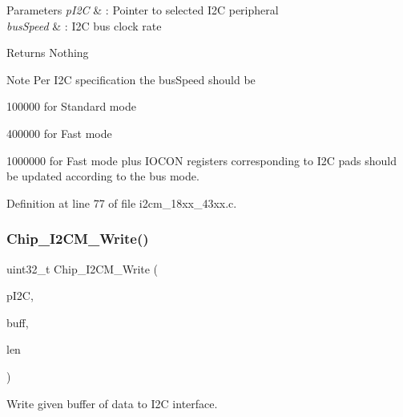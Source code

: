 \begin{DoxyParams}{Parameters}
{\em p\+I2C} & \+: Pointer to selected I2C peripheral \\
\hline
{\em bus\+Speed} & \+: I2C bus clock rate \\
\hline
\end{DoxyParams}
\begin{DoxyReturn}{Returns}
Nothing 
\end{DoxyReturn}
\begin{DoxyNote}{Note}
Per I2C specification the bus\+Speed should be \begin{DoxyItemize}
\item 100000 for Standard mode \item 400000 for Fast mode \item 1000000 for Fast mode plus I\+O\+C\+ON registers corresponding to I2C pads should be updated according to the bus mode. \end{DoxyItemize}

\end{DoxyNote}


Definition at line 77 of file i2cm\+\_\+18xx\+\_\+43xx.\+c.

\mbox{\label{group___i2_c_m__18_x_x__43_x_x_ga6f18f520e51c790fef5009e9446f74d5}} 
\subsubsection{\texorpdfstring{Chip\+\_\+\+I2\+C\+M\+\_\+\+Write()}{Chip\_I2CM\_Write()}}
{\footnotesize\ttfamily uint32\+\_\+t Chip\+\_\+\+I2\+C\+M\+\_\+\+Write (\begin{DoxyParamCaption}\item[{\hyperlink{struct_l_p_c___i2_c___t}{L\+P\+C\+\_\+\+I2\+C\+\_\+T} $\ast$}]{p\+I2C,  }\item[{const uint8\+\_\+t $\ast$}]{buff,  }\item[{uint32\+\_\+t}]{len }\end{DoxyParamCaption})}



Write given buffer of data to I2C interface. 


